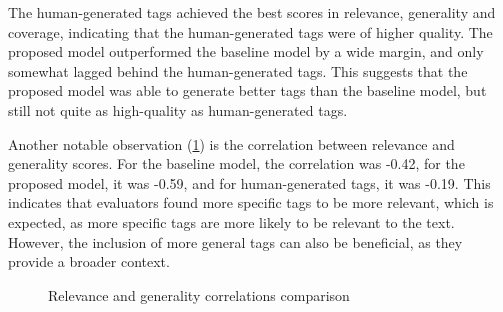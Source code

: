 The human-generated tags achieved the best scores in relevance, generality and coverage, indicating that the human-generated tags were of higher quality. The proposed model outperformed the baseline model by a wide margin, and only somewhat lagged behind the human-generated tags. This suggests that the proposed model was able to generate better tags than the baseline model, but still not quite as high-quality as human-generated tags.

Another notable observation (\cref{fig:tags_correlations}) is the correlation between relevance and generality scores. For the baseline model, the correlation was -0.42, for the proposed model, it was -0.59, and for human-generated tags, it was -0.19. This indicates that evaluators found more specific tags to be more relevant, which is expected, as more specific tags are more likely to be relevant to the text. However, the inclusion of more general tags can also be beneficial, as they provide a broader context.

\begin{figure}[h]
    \centering
    \hfill

    \caption{Relevance and generality correlations comparison}
    \label{fig:tags_correlations}
\end{figure}

